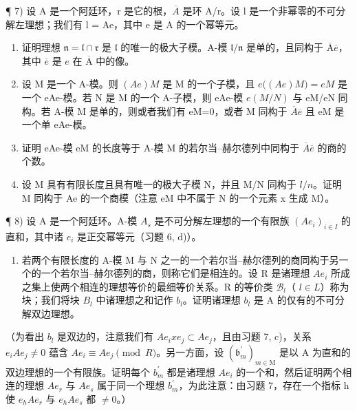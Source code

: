 ¶ 7) 设 A 是一个阿廷环，r 是它的根，\(\overline{A}\) 是环 A/r。设 l 是一个非幂零的不可分解左理想；我们有 l = Ae，其中 e 是 A 的一个幂等元。

\begin{enumerate}
\def\labelenumi{\alph{enumi})}
\item
  证明理想 \(\mathfrak{n} = \mathfrak{l} \cap \mathfrak{r}\) 是 \(\mathfrak{l}\) 的唯一的极大子模。A-模 \(\mathfrak{l} / \mathfrak{n}\) 是单的，且同构于 \(\overline{\mathrm{A}}\overline{e}\)，其中 \(\overline{e}\) 是 \(e\) 在 \(\overline{\mathrm{A}}\) 中的像。
\item
  设 M 是一个 A-模。则 \((Ae)M\) 是 M 的一个子模，且 \(e\big((Ae)M\big)=eM\) 是一个 eAe-模。若 N 是 M 的一个 A-子模，则 eAe-模 \(e(M/N)\) 与 eM/eN 同构。若 A-模 M 是单的，则或者我们有 eM=0，或者 M 同构于 \(\overline{A}\overline{e}\) 且 eM 是一个单 eAe-模。
\item
  证明 eAe-模 eM 的长度等于 A-模 M 的若尔当–赫尔德列中同构于 \(\overline{A}\overline{e}\) 的商的个数。
\item
  设 M 具有有限长度且具有唯一的极大子模 N，并且 M/N 同构于 \(l/n\)。证明 M 同构于 Ae 的一个商模（注意 eM 中不属于 N 的一个元素 x 生成 M）。
\end{enumerate}

¶ 8) 设 A 是一个阿廷环。A-模 \(A_{s}\) 是不可分解左理想的一个有限族 \((Ae_{i})_{i\in I}\) 的直和，其中诸 \(e_{i}\) 是正交幂等元（习题 6, d)）。

\begin{enumerate}
\def\labelenumi{\alph{enumi})}
\tightlist
\item
  若两个有限长度的 A-模 M 与 N 之一的一个若尔当–赫尔德列的商同构于另一个的一个若尔当–赫尔德列的商，则称它们是相连的。设 R 是诸理想 \(Ae_{i}\) 所成之集上使两个相连的理想等价的最细等价关系。R 的等价类 \(\mathcal{B}_{l}\)（ \(l \in L\)）称为块；我们将块 \(B_{l}\) 中诸理想之和记作 \(b_{l}\)。证明诸理想 \(b_{l}\) 是 A 的仅有的不可分解双边理想。
\end{enumerate}

（为看出 \(b_{l}\) 是双边的，注意我们有 \(Ae_{i}xe_{j} \subset Ae_{j}\)，且由习题 7, c)，关系 \(e_{i}Ae_{j} \neq 0\) 蕴含 \(Ae_{i} \equiv Ae_{j} \pmod{R}\)。另一方面，设 \((\mathfrak{b}_{m}^{\prime})_{m \in \mathrm{M}}\) 是以 A 为直和的双边理想的一个有限族。证明每个 \(b_{m}^{\prime}\) 都是诸理想 \(Ae_{i}\) 的一个和，然后证明两个相连的理想 \(Ae_{r}\) 与 \(Ae_{s}\) 属于同一个理想 \(b_{m}^{\prime}\)，为此注意：由习题 7，存在一个指标 h 使 \(e_{h}Ae_{r}\) 与 \(e_{h}Ae_{s}\) 都 \(\neq 0\)。）

